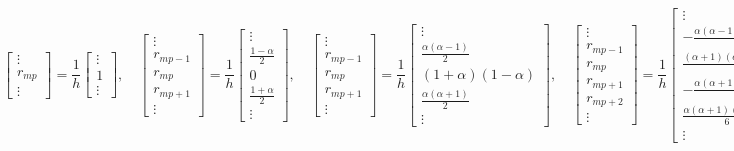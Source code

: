 \begin{equation}\label{eq:LagrangeArrays}
\begin{bmatrix}
\vdots\\
r_{mp} \\
\vdots
\end{bmatrix} = \frac{1}{h}\begin{bmatrix}
\vdots\\
1 \\
\vdots
\end{bmatrix},\quad 
\begin{bmatrix}
\vdots\\
r_{mp-1} \\
r_{mp} \\
r_{mp+1} \\
\vdots
\end{bmatrix} = \frac{1}{h}\begin{bmatrix}
\vdots\\
\frac{1-\alpha}{2} \\
0 \\
\frac{1+\alpha}{2} \\
\vdots
\end{bmatrix},\quad
\begin{bmatrix}
\vdots\\
r_{mp-1} \\
r_{mp} \\
r_{mp+1} \\
\vdots
\end{bmatrix} = \frac{1}{h}\begin{bmatrix}
\vdots\\
\frac{\alpha(\alpha-1)}{2} \\
(1+\alpha)(1-\alpha) \\
\frac{\alpha(\alpha+1)}{2} \\
\vdots
\end{bmatrix},\quad
\begin{bmatrix}
\vdots\\
r_{mp-1} \\
r_{mp} \\
r_{mp+1} \\
r_{mp+2} \\
\vdots
\end{bmatrix} = \frac{1}{h}\begin{bmatrix}
\vdots\\
-\frac{\alpha(\alpha-1)(\alpha-2)}{6} \\
\frac{(\alpha+1)(\alpha-1)(\alpha-2)}{2} \\
-\frac{\alpha(\alpha+1)(\alpha-2)}{2} \\
\frac{\alpha(\alpha+1)(\alpha-1)}{6}\\
\vdots
\end{bmatrix}
\end{equation}
